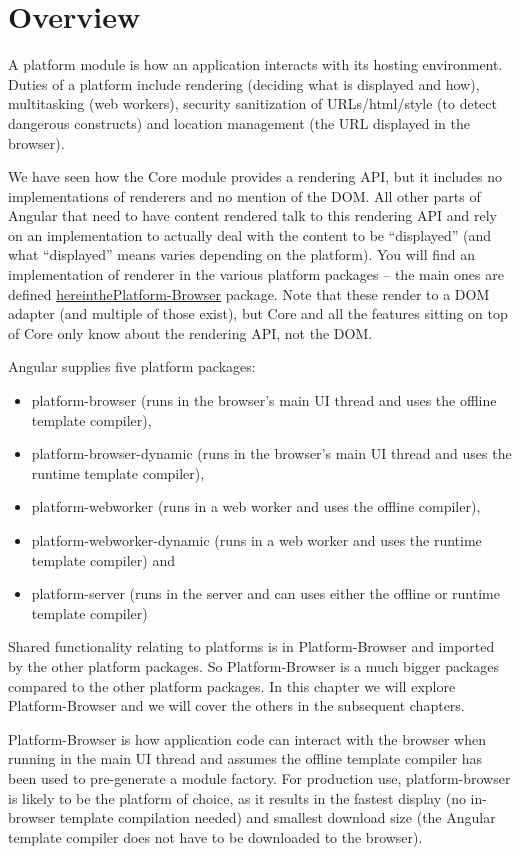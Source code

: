 \section{Overview}

A platform module is how an application interacts with its hosting environment. Duties
of a platform include rendering (deciding what is displayed and how), multitasking
(web workers), security sanitization of URLs/html/style (to detect dangerous
constructs) and location management (the URL displayed in the browser).

We have seen how the Core module provides a rendering API, but it includes no
implementations of renderers and no mention of the DOM. All other parts of Angular
that need to have content rendered talk to this rendering API and rely on an
implementation to actually deal with the content to be “displayed” (and what
“displayed” means varies depending on the platform). You will find an implementation
of renderer in the various platform packages – the main ones are defined
\url{hereinthePlatform-Browser}
package. Note that these render to a DOM adapter (and multiple of
those exist), but Core and all the features sitting on top of Core only know about the
rendering API, not the DOM.

Angular supplies five platform packages:

\begin{itemize}
  \item platform-browser (runs in the browser’s main UI thread and uses the offline template compiler),
  \item platform-browser-dynamic (runs in the browser’s main UI thread and uses the runtime template compiler),
  \item platform-webworker (runs in a web worker and uses the offline compiler),
  \item platform-webworker-dynamic (runs in a web worker and uses the runtime template compiler) and
  \item platform-server (runs in the server and can uses either the offline or runtime template compiler)
\end{itemize}

Shared functionality relating to platforms is in Platform-Browser and imported by the
other platform packages. So Platform-Browser is a much bigger packages compared
to the other platform packages. In this chapter we will explore Platform-Browser and
we will cover the others in the subsequent chapters.

Platform-Browser is how application code can interact with the browser when running
in the main UI thread and assumes the offline template compiler has been used to
pre-generate a module factory. For production use, platform-browser is likely to be
the platform of choice, as it results in the fastest display (no in-browser template
compilation needed) and smallest download size (the Angular template compiler does
not have to be downloaded to the browser).

